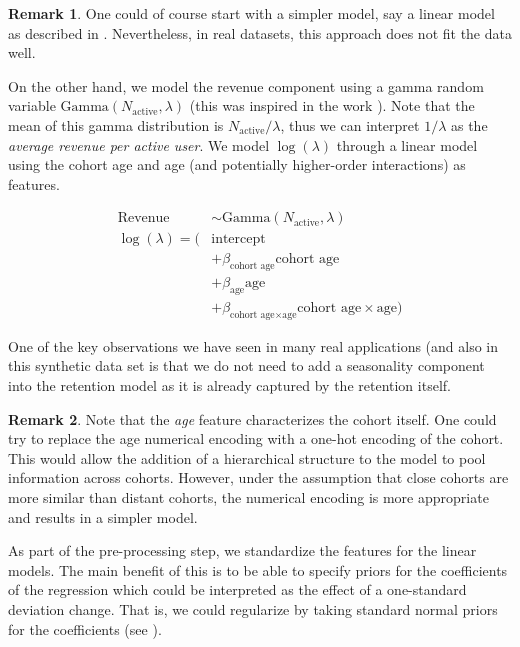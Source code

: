 \documentclass[11pt]{amsart}
\theoremstyle{definition}
\newtheorem{remark}{Remark}
\begin{document}
\begin{remark}
One could of course start with a simpler model, say a linear model as described in
\cite{orduz_revenue_retention}. Nevertheless, in real datasets, this approach does not
fit the data well. 
\end{remark}

On the other hand, we model the revenue component using a gamma random variable
$\text{Gamma}(N_{\text{active}}, \lambda)$ (this was inspired in the work
\cite{stucchio2015bayesian}). Note that the mean of this gamma distribution is
$N_{\text{active}} / \lambda$, thus we can interpret $1 / \lambda$ as the
{\em average revenue per active user}. We model $\log(\lambda)$ through a linear model
using the cohort age and age (and potentially higher-order interactions) as
features. 

\begin{align*}
    \text{Revenue} & \sim \text{Gamma}(N_{\text{active}}, \lambda) \\
    \log(\lambda) = (& \text{intercept} \\
        & + \beta_{\text{cohort age}} \text{cohort age} \\
        & + \beta_{\text{age}} \text{age} \\
        & + \beta_{\text{cohort age} \times \text{age}} \text{cohort age} \times \text{age})
\end{align*}

One of the key observations we have seen in many real applications (and also
in this synthetic data set is that we do not need to add a seasonality component into
the retention model as it is already captured by the retention itself.

\begin{remark}
Note that the {\em age} feature characterizes the cohort itself. One could try to replace
the age numerical encoding with a one-hot encoding of the cohort. This would allow the 
addition of a hierarchical structure to the model to pool information across cohorts.
However, under the assumption that close cohorts are more similar than distant cohorts,
the numerical encoding is more appropriate and results in a simpler model.
\end{remark}

As part of the pre-processing step, we standardize the features for the linear models.
The main benefit of this is to be able to specify priors for the coefficients of the
regression which could be interpreted as the effect of a one-standard deviation change.
That is, we could regularize by taking standard normal priors for the coefficients (see
\cite{orduz_retention_bart}). \\
\end{document}
